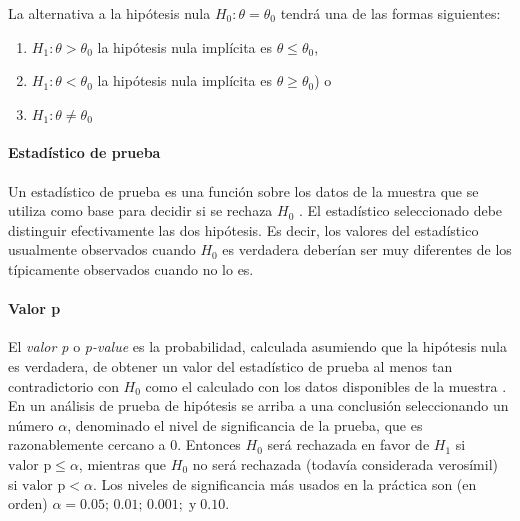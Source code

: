 La alternativa a la hipótesis nula $H_{0}: \theta=\theta_{0}$ tendrá una de las formas siguientes:
\begin{enumerate}
  \item $H_{1}: \theta > \theta_{0}$ la hipótesis nula implícita es $\theta \le \theta_{0}$,
  \item $H_{1}: \theta < \theta_{0}$ la hipótesis nula implícita es $\theta \ge \theta_{0}$) o
  \item $H_{1}: \theta \ne \theta_{0}$
\end{enumerate}

\paragraph{Estadístico de prueba}
Un estadístico de prueba es una función sobre los datos de la muestra que se utiliza como base para decidir si se rechaza $H_{0}$ \cite{devore2015probability}. El estadístico seleccionado debe distinguir efectivamente las dos hipótesis. Es decir, los valores del estadístico usualmente observados cuando $H_{0}$ es verdadera deberían ser muy diferentes de los típicamente observados cuando no lo es.

\paragraph{Valor p}
El \emph{valor p} o \emph{p-value} es la probabilidad, calculada asumiendo que la hipótesis nula es verdadera, de obtener un valor del estadístico de prueba al menos tan contradictorio con $H_{0}$ como el calculado con los datos disponibles de la muestra \cite{devore2015probability}. En un análisis de prueba de hipótesis se arriba a una conclusión seleccionando un número $\alpha$, denominado el nivel de significancia de la prueba, que es razonablemente cercano a 0. Entonces $H_{0}$ será rechazada en favor de $H_{1}$ si $\text{valor p} \le \alpha$, mientras que $H_{0}$ no será rechazada (todavía considerada verosímil) si $\text{valor p} < \alpha$. Los niveles de significancia más usados en la práctica son (en orden) $\alpha = 0.05;\,0.01;\,0.001;\;\text{y}\;0.10$.

